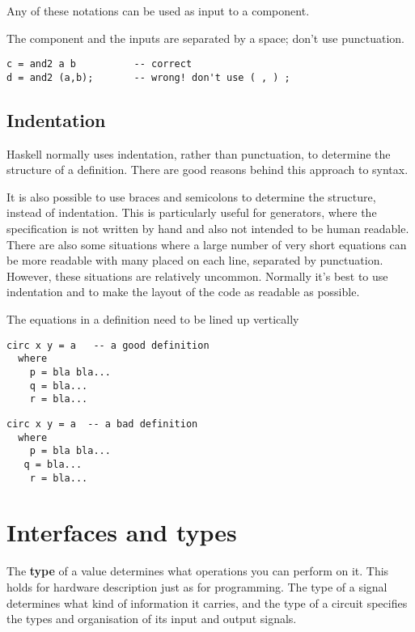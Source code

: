 \documentclass[11pt]{article}
\begin{document}
Any of these notations can be used as input to a component.

The component and the inputs are separated by a space; don't use
punctuation.

\begin{verbatim}
c = and2 a b          -- correct
d = and2 (a,b);       -- wrong! don't use ( , ) ;
\end{verbatim}

\subsection{Indentation}
\label{sec:org9282b80}

Haskell normally uses indentation, rather than punctuation, to
determine the structure of a definition.  There are good reasons
behind this approach to syntax.

It is also possible to use braces and semicolons to determine the
structure, instead of indentation.  This is particularly useful for
generators, where the specification is not written by hand and also
not intended to be human readable.  There are also some situations
where a large number of very short equations can be more readable with
many placed on each line, separated by punctuation.  However, these
situations are relatively uncommon.  Normally it's best to use
indentation and to make the layout of the code as readable as
possible.

The equations in a definition need to be lined up vertically

\begin{verbatim}
circ x y = a   -- a good definition
  where
    p = bla bla...
    q = bla...
    r = bla...
\end{verbatim}

\begin{verbatim}
circ x y = a  -- a bad definition
  where
    p = bla bla...
   q = bla...
    r = bla...
\end{verbatim}



\section{Interfaces and types}
\label{sec:org68b7430}

The \textbf{type} of a value determines what operations you can perform on
it.  This holds for hardware description just as for programming.  The
type of a signal determines what kind of information it carries, and
the type of a circuit specifies the types and organisation of its
input and output signals.
\end{document}
